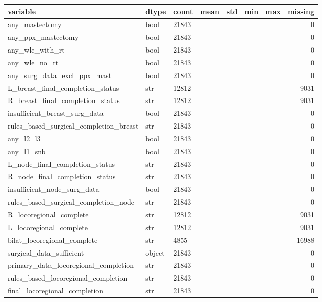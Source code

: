 \begin{tabular}{lllllllr}
\toprule
variable & dtype & count & mean & std & min & max & missing \\
\midrule
any\_mastectomy & bool & 21843 &  &  &  &  & 0 \\
any\_ppx\_mastectomy & bool & 21843 &  &  &  &  & 0 \\
any\_wle\_with\_rt & bool & 21843 &  &  &  &  & 0 \\
any\_wle\_no\_rt & bool & 21843 &  &  &  &  & 0 \\
any\_surg\_data\_excl\_ppx\_mast & bool & 21843 &  &  &  &  & 0 \\
L\_breast\_final\_completion\_status & str & 12812 &  &  &  &  & 9031 \\
R\_breast\_final\_completion\_status & str & 12812 &  &  &  &  & 9031 \\
insufficient\_breast\_surg\_data & bool & 21843 &  &  &  &  & 0 \\
rules\_based\_surgical\_completion\_breast & str & 21843 &  &  &  &  & 0 \\
any\_l2\_l3 & bool & 21843 &  &  &  &  & 0 \\
any\_l1\_snb & bool & 21843 &  &  &  &  & 0 \\
L\_node\_final\_completion\_status & str & 21843 &  &  &  &  & 0 \\
R\_node\_final\_completion\_status & str & 21843 &  &  &  &  & 0 \\
insufficient\_node\_surg\_data & bool & 21843 &  &  &  &  & 0 \\
rules\_based\_surgical\_completion\_node & str & 21843 &  &  &  &  & 0 \\
R\_locoregional\_complete & str & 12812 &  &  &  &  & 9031 \\
L\_locoregional\_complete & str & 12812 &  &  &  &  & 9031 \\
bilat\_locoregional\_complete & str & 4855 &  &  &  &  & 16988 \\
surgical\_data\_sufficient & object & 21843 &  &  &  &  & 0 \\
primary\_data\_locoregional\_completion & str & 21843 &  &  &  &  & 0 \\
rules\_based\_locoregional\_completion & str & 21843 &  &  &  &  & 0 \\
final\_locoregional\_completion & str & 21843 &  &  &  &  & 0 \\
\bottomrule
\end{tabular}
